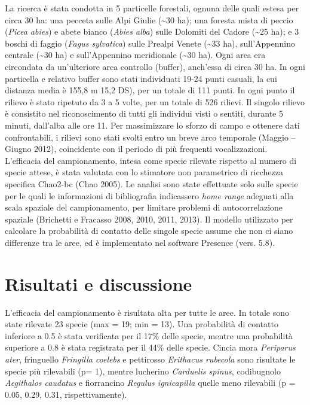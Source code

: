 {
{La ricerca \`e stata condotta in 5
particelle forestali, ognuna delle quali estesa per circa 30 ha: una
pecceta sulle Alpi Giulie (\textasciitilde30 ha); una foresta mista di peccio
(}\textit{{Picea
abies}}{) e abete bianco
(}\textit{{Abies
alba}}{) sulle Dolomiti del Cadore (\textasciitilde25
ha); e 3 boschi di faggio
(}\textit{{Fagus sylvatica}}{)
sulle Prealpi Venete (\textasciitilde 33 ha), sull{\textquoteright}Appennino
centrale (\textasciitilde 30 ha) e sull{\textquoteright}Appennino meridionale
(\textasciitilde 30 ha). Ogni area era circondata da un{\textquoteright}ulteriore
area controllo (buffer), anch{\textquoteright}essa di circa 30 ha. In
ogni particella e relativo buffer sono stati individuati 19-24 punti
casuali, la cui distanza media \`e 155,8 m {\textpm} 15,2 DS), per un
totale di 111 punti. In ogni punto il rilievo \`e stato ripetuto da 3 a
5 volte, per un totale di 526 rilievi. Il singolo rilievo \`e
consistito nel riconoscimento di tutti gli individui visti o sentiti,
durante 5 minuti, dall{\textquoteright}alba alle ore 11. Per
massimizzare lo sforzo di campo e ottenere dati confrontabili, i
rilievi sono stati svolti entro un breve arco temporale (Maggio --
Giugno 2012), coincidente con il periodo di pi\`u frequenti
vocalizzazioni. L{\textquoteright}efficacia del campionamento, intesa
come specie rilevate rispetto al numero di specie attese, \`e stata
valutata con lo stimatore non parametrico di ricchezza specifica
Chao2-bc (Chao 2005). Le analisi sono state effettuate solo sulle
specie per le quali le informazioni di bibliografia indicassero
}\textit{{home range
}}{adeguati alla scala spaziale del
campionamento, per limitare problemi di autocorrelazione spaziale
(Brichetti e Fracasso 2008, 2010, 2011, 2013). Il modello utilizzato
per calcolare la probabilit\`a di contatto delle singole specie assume
che non ci siano differenze tra le aree, ed \`e implementato nel
software Presence (vers. 5.8).}~}

\section*{Risultati e discussione}

{
{L{\textquoteright}efficacia del
campionamento \`e risultata alta per tutte le aree. In totale sono
state rilevate 23 specie (max = 19; min = 13). Una probabilit\`a di
contatto inferiore a 0.5 \`e stata verificata per il 17\% delle specie,
mentre una probabilit\`a superiore a 0.8 \`e stata registrata per il
44\% delle specie. Cincia mora
}\textit{{Periparus ater}}{, fringuello
}\textit{{Fringilla coelebs}}{ e pettirosso
}\textit{{Erithacus rubecola}}{ sono risultate le specie pi\`u
rilevabili (p= 1), mentre lucherino
}\textit{{Carduelis spinus}}{, codibugnolo
}\textit{{Aegithalos caudatus}}{ e fiorrancino
}\textit{{Regulus ignicapilla}}{ quelle meno rilevabili (p =
0.05, 0.29, 0.31, rispettivamente).}}

